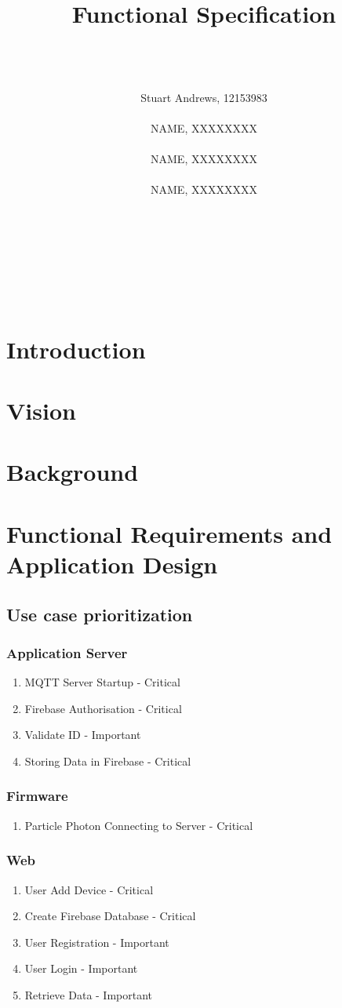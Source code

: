 \documentclass{article}
\title{Functional Specification}
\author
{  
	\\\\\\
	Stuart Andrews, 12153983 
	\\\\
	NAME, XXXXXXXX
	\\\\
	NAME, XXXXXXXX 
	\\\\
	NAME, XXXXXXXX 
	\\\\\\\\\\\\\\
}
\begin{document}
\maketitle
\thispagestyle{empty}
\newpage
\tableofcontents
\newpage

\section{Introduction}
\section{Vision}
\section{Background}
\section{Functional Requirements and Application Design}
\subsection{Use case prioritization}
\subsubsection{Application Server}
\begin{enumerate}
	\item	MQTT Server Startup - Critical
	\item	Firebase Authorisation - Critical
	\item	Validate ID - Important
	\item	Storing Data in Firebase - Critical
\end{enumerate}
\subsubsection{Firmware}
\begin{enumerate}
	\item	Particle Photon Connecting to Server - Critical
\end{enumerate}
\subsubsection{Web}
\begin{enumerate}
	\item	User Add Device - Critical
	\item	Create Firebase Database - Critical
	\item	User Registration - Important
	\item	User Login - Important
	\item	Retrieve Data  - Important
\end{enumerate}
\end{document}
